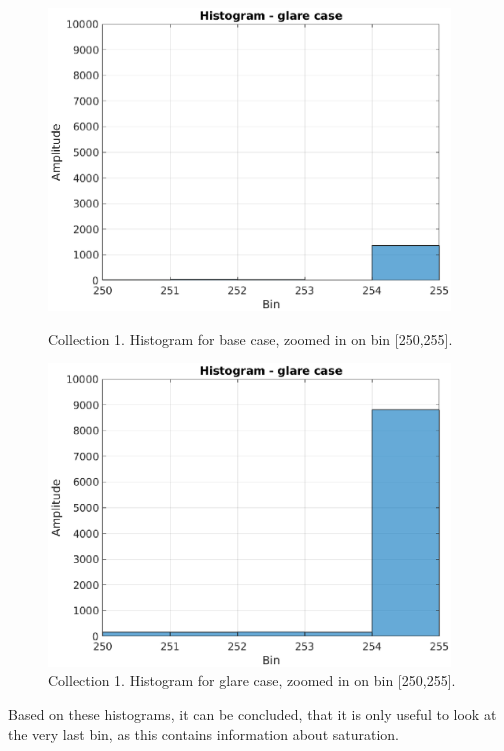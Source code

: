 \begin{figure}[h!]
    \centering
    \begin{minipage}[t]{0.48\textwidth}
        \centering
        \includegraphics[width=0.95\textwidth]{figures/ImageAnalysis/Histogram_base1_zoom.eps}
        \caption{Collection 1. Histogram for base case, zoomed in on bin [250,255].}
    \label{fig:hist_base1_zoom}
    \end{minipage}%
    \hspace{.03\textwidth}
    \begin{minipage}[t]{0.48\textwidth}
        \centering
        \includegraphics[width=0.95\textwidth]{figures/ImageAnalysis/Histogram_glare1_zoom.eps}
        \caption{Collection 1. Histogram for glare case, zoomed in on bin [250,255].}
        \label{fig:hist_glare1_zoom}
    \end{minipage}
\end{figure}
\FloatBarrier
Based on these histograms, it can be concluded, that it is only useful to look at the very last bin, as this contains information about saturation.\\

